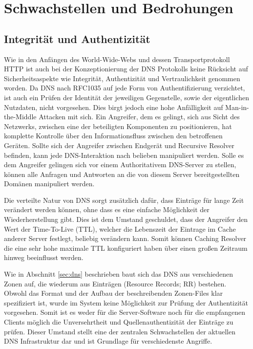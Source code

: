 \chapter{Schwachstellen und Bedrohungen}
\label{chap:threads}


\section{Integrität und Authentizität}
\label{sec:Thread-Auth}

Wie in den Anfängen des World-Wide-Webs und dessen Transportprotokoll HTTP ist auch bei der Konzeptionierung der DNS Protokolls keine Rücksicht auf Sicherheitsaspekte wie Integrität, Authentizität und Vertraulichkeit genommen worden. Da DNS nach RFC1035 auf jede Form von Authentifizierung verzichtet, ist auch ein Prüfen der Identität der jeweiligen Gegenstelle, sowie der eigentlichen Nutzdaten, nicht vorgesehen. Dies birgt jedoch eine hohe Anfälligkeit auf Man-in-the-Middle Attacken mit sich. Ein Angreifer, dem es gelingt, sich aus Sicht des Netzwerks, zwischen eine der beteiligten Komponenten zu positionieren, hat komplette Kontrolle über den Informationsfluss zwischen den betroffenen Geräten. Sollte sich der Angreifer zwischen Endgerät und Recursive Resolver befinden, kann jede DNS-Interaktion nach belieben manipuliert werden. Solle es dem Angreifer gelingen sich vor einem Authoritativem DNS-Server zu stellen, können alle Anfragen und Antworten an die von diesem Server bereitgestellten Domänen manipuliert werden. 

Die verteilte Natur von DNS sorgt zusätzlich dafür, dass Einträge für lange Zeit verändert werden können, ohne dass es eine einfache Möglichkeit der Wiederherstellung gibt. Dies ist dem Umstand geschuldet, dass der Angreifer den Wert der Time-To-Live (TTL), welcher die Lebenszeit der Eintrage im Cache anderer Server festlegt, beliebig verändern kann. Somit können Caching Resolver die eine sehr hohe maximale TTL konfiguriert haben über einen großen Zeitraum hinweg beeinflusst werden.

Wie in Abschnitt \ref{sec:dns} beschrieben baut sich das DNS aus verschiedenen Zonen auf, die wiederum aus Einträgen (Resource Records; RR) bestehen. Obwohl das Format und der Aufbau der beschreibenden Zonen-Files klar spezifiziert ist, wurde im System keine Möglichkeit zur Prüfung der Authentizität vorgesehen. Somit ist es weder für die Server-Software noch für die empfangenen Clients möglich die Unversehrtheit und Quellenauthentizität der Einträge zu prüfen. Dieser Umstand stellt eine der zentralen Schwachstellen der aktuellen DNS Infrastruktur dar und ist Grundlage für verschiedenste Angriffe.


